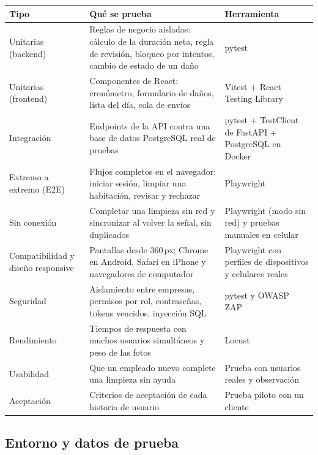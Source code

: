 \documentclass[11pt,a4paper]{article}
\begin{document}
\begin{center}
\small
\begin{tabularx}{\linewidth}{L{2.9cm} Y L{3.6cm}}
\toprule
\textbf{Tipo} & \textbf{Qué se prueba} & \textbf{Herramienta}\\
\midrule
Unitarias (backend) & Reglas de negocio aisladas: cálculo de la duración neta, regla de revisión, bloqueo por intentos, cambio de estado de un daño & pytest\\
Unitarias (frontend) & Componentes de React: cronómetro, formulario de daños, lista del día, cola de envíos & Vitest + React Testing Library\\
Integración & Endpoints de la API contra una base de datos PostgreSQL real de pruebas & pytest + TestClient de FastAPI + PostgreSQL en Docker\\
Extremo a extremo (E2E) & Flujos completos en el navegador: iniciar sesión, limpiar una habitación, revisar y rechazar & Playwright\\
Sin conexión & Completar una limpieza sin red y sincronizar al volver la señal, sin duplicados & Playwright (modo sin red) y pruebas manuales en celular\\
Compatibilidad y diseño responsive & Pantallas desde 360\,px; Chrome en Android, Safari en iPhone y navegadores de computador & Playwright con perfiles de dispositivos y celulares reales\\
Seguridad & Aislamiento entre empresas, permisos por rol, contraseñas, tokens vencidos, inyección SQL & pytest y OWASP ZAP\\
Rendimiento & Tiempos de respuesta con muchos usuarios simultáneos y peso de las fotos & Locust\\
Usabilidad & Que un empleado nuevo complete una limpieza sin ayuda & Prueba con usuarios reales y observación\\
Aceptación & Criterios de aceptación de cada historia de usuario & Prueba piloto con un cliente\\
\bottomrule
\end{tabularx}
\end{center}

\subsection{Entorno y datos de prueba}
\end{document}
